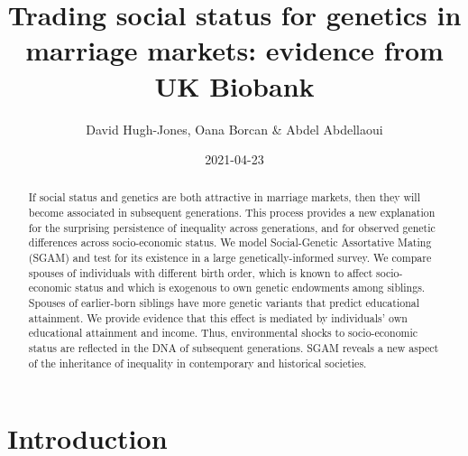 \documentclass[
]{article}
\title{Trading social status for genetics in marriage markets: evidence from UK Biobank}
\author{David Hugh-Jones, Oana Borcan \& Abdel Abdellaoui}
\date{2021-04-23}
\begin{document}
\maketitle
\begin{abstract}
If social status and genetics are both attractive in marriage markets, then
they will become associated in subsequent generations. This process provides a
new explanation for the surprising persistence of inequality across generations,
and for observed genetic differences across socio-economic status. We model
Social-Genetic Assortative Mating (SGAM) and test for its existence in a large
genetically-informed survey. We compare spouses of individuals with different
birth order, which is known to affect socio-economic status and which is
exogenous to own genetic endowments among siblings. Spouses of
earlier-born siblings have more genetic variants that predict educational
attainment. We provide evidence that this effect is mediated by individuals'
own educational attainment and income. Thus, environmental shocks to
socio-economic status are reflected in the DNA of subsequent generations.
SGAM reveals a new aspect of the inheritance of inequality in contemporary and
historical societies.
\end{abstract}

\normalem

\hypertarget{introduction}{%
\section{Introduction}\label{introduction}}
\end{document}
